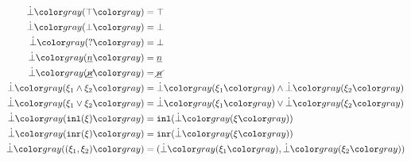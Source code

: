 ~~
\begin{subequations}\label{defn:falsify}
\begin{align}
  \cfalsify{\ctruth} &= \ctruth \\
  \cfalsify{\cfalsity} &= \cfalsity \\
  \cfalsify{\cunknown} &= \cfalsity \\
  \cfalsify{\cnum{n}} &= \cnum{n} \\
  \cfalsify{\cnotnum{n}} &= \cnotnum{n} \\
  \cfalsify{\cand{\xi_1}{\xi_2}} &= \cand{\cfalsify{\xi_1}}{\cfalsify{\xi_2}} \\
  \cfalsify{\cor{\xi_1}{\xi_2}} &= \cor{\cfalsify{\xi_1}}{\cfalsify{\xi_2}} \\
  \cfalsify{\cinl{\xi}} &= \cinl{\cfalsify{\xi}} \\
  \cfalsify{\cinr{\xi}} &= \cinr{\cfalsify{\xi}} \\
  \cfalsify{\cpair{\xi_1}{\xi_2}} &= \cpair{\cfalsify{\xi_1}}{\cfalsify{\xi_2}}
\end{align}
\end{subequations}

\newpage

